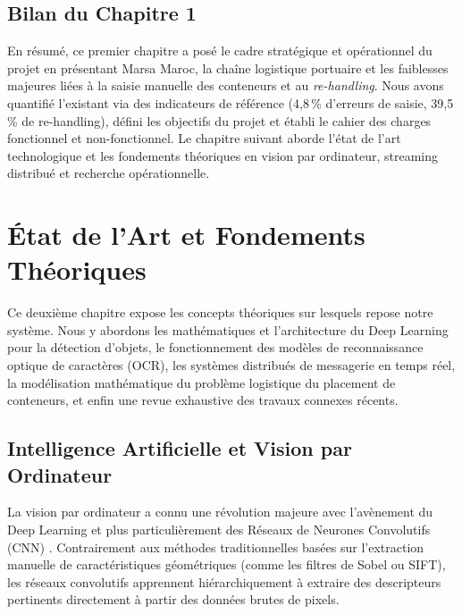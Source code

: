 \documentclass[12pt,a4paper]{article}
\begin{document}
\subsection{Bilan du Chapitre 1}
En résumé, ce premier chapitre a posé le cadre stratégique et opérationnel du projet en présentant Marsa Maroc, la chaîne logistique portuaire et les faiblesses majeures liées à la saisie manuelle des conteneurs et au \textit{re-handling}. Nous avons quantifié l'existant via des indicateurs de référence (4,8\,\% d'erreurs de saisie, 39,5\,\% de re-handling), défini les objectifs du projet et établi le cahier des charges fonctionnel et non-fonctionnel. Le chapitre suivant aborde l'état de l'art technologique et les fondements théoriques en vision par ordinateur, streaming distribué et recherche opérationnelle.

\newpage

\section{État de l'Art et Fondements Théoriques}

Ce deuxième chapitre expose les concepts théoriques sur lesquels repose notre système. Nous y abordons les mathématiques et l'architecture du Deep Learning pour la détection d'objets, le fonctionnement des modèles de reconnaissance optique de caractères (OCR), les systèmes distribués de messagerie en temps réel, la modélisation mathématique du problème logistique du placement de conteneurs, et enfin une revue exhaustive des travaux connexes récents.

\subsection{Intelligence Artificielle et Vision par Ordinateur}

La vision par ordinateur a connu une révolution majeure avec l'avènement du Deep Learning et plus particulièrement des Réseaux de Neurones Convolutifs (CNN) \cite{LeCun2015, Goodfellow2016}. Contrairement aux méthodes traditionnelles basées sur l'extraction manuelle de caractéristiques géométriques (comme les filtres de Sobel ou SIFT), les réseaux convolutifs apprennent hiérarchiquement à extraire des descripteurs pertinents directement à partir des données brutes de pixels.
\end{document}
